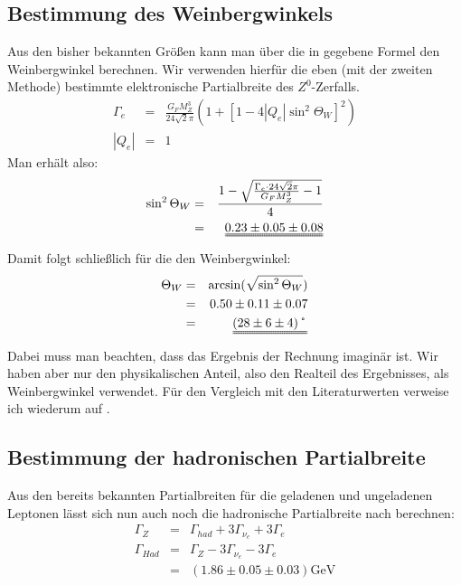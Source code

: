 \subsection{Bestimmung des Weinbergwinkels}
Aus den bisher bekannten Größen kann man über die in \cite[Gl.6]{script} gegebene Formel den Weinbergwinkel berechnen. Wir verwenden hierfür die eben (mit der zweiten Methode) bestimmte elektronische Partialbreite des $Z^0$-Zerfalls.
\begin{eqnarray}
\Gamma_e &=& \frac{G_F M_Z^3}{24 \sqrt{2}\pi}\left(1+[1-4|Q_e|\sin^2\Theta_W]^2\right)\\
|Q_e| &=& 1
\end{eqnarray}
Man erhält also:
\begin{eqnarray}
\sin^2\Theta_W &=& \frac{1-\sqrt{\frac{\Gamma_e\cdot 24\sqrt{2}\pi}{G_FM_Z^3}-1}}{4}\\
\nonumber &=& \uuline{0.23 \pm 0.05 \pm 0.08}
\end{eqnarray}
Damit folgt schließlich für die den Weinbergwinkel:
\begin{eqnarray}
\Theta_W &=& \arcsin(\sqrt{\sin^2\Theta_W})\\
\nonumber &=& 0.50 \pm 0.11 \pm 0.07\\
\nonumber &=& \uuline{(28 \pm 6 \pm 4)\symbol{23}}
\end{eqnarray}
Dabei muss man beachten, dass das Ergebnis der Rechnung imaginär ist. Wir haben aber nur den physikalischen Anteil, also den Realteil des Ergebnisses, als Weinbergwinkel verwendet. Für den Vergleich mit den Literaturwerten verweise ich wiederum auf \cite[Kap. 5]{kap5}.

\subsection{Bestimmung der hadronischen Partialbreite}
Aus den bereits bekannten Partialbreiten für die geladenen und ungeladenen Leptonen lässt sich nun auch noch die hadronische Partialbreite nach \cite[Gl.8]{script} berechnen:
\begin{eqnarray}
\Gamma_Z &=& \Gamma_{had} + 3\Gamma_{\nu_e} + 3\Gamma_e\\
\Gamma_{Had} &=& \Gamma_Z - 3\Gamma_{\nu_e} - 3\Gamma_e\\
\nonumber &=& (1.86 \pm 0.05 \pm 0.03)\si{\giga\electronvolt}
\end{eqnarray}

